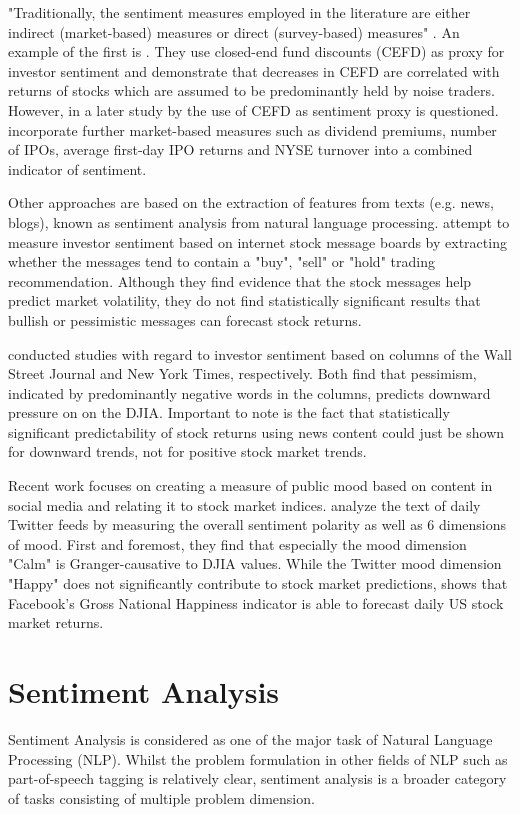 \documentclass[a4paper,12pt]{article}%
\begin{document}
"Traditionally, the sentiment measures employed in the literature are either indirect (market-based) measures or direct (survey-based) measures" \citep{Karabulut2013}. An example of the first is \citet{Lee1991}. They use closed-end fund discounts (CEFD) as proxy for investor sentiment and demonstrate that decreases in CEFD are correlated with returns of stocks which are assumed to be predominantly held by noise traders. However, in a later study by \citet{Qui2004}  the use of CEFD as sentiment proxy is questioned. \citet{Baker2006} incorporate further market-based measures such as dividend premiums, number of IPOs, average first-day IPO returns and NYSE turnover into a combined indicator of sentiment.

Other approaches are based on the extraction of features from texts (e.g. news, blogs), known as sentiment analysis from natural language processing. \citet{Antweiler2004} attempt to measure investor sentiment based on internet stock message boards by extracting whether the messages tend to contain a "buy", "sell" or "hold" trading recommendation. Although they find evidence that the stock messages help predict market volatility, they do not find statistically significant results that bullish or pessimistic messages can forecast stock returns.

\citet{Tetlock2007, Garcia2012} conducted studies with regard to investor sentiment based on columns of the Wall Street Journal and New York Times, respectively. Both find that pessimism, indicated by predominantly negative words in the columns, predicts downward pressure on on the DJIA. Important to note is the fact that statistically significant predictability of stock returns using news content could just be shown for downward trends, not for positive stock market trends.

Recent work focuses on creating a measure of public mood based on content in social media and relating it to stock market indices. \citet{Bollen2011} analyze the text of daily Twitter feeds by measuring the overall sentiment polarity as well as 6 dimensions of mood. First and foremost, they find that especially the mood dimension "Calm" is Granger-causative to DJIA values. While the Twitter mood dimension "Happy" does not significantly contribute to stock market predictions, \citet{Karabulut2013} shows that Facebook's Gross National Happiness indicator is able to forecast daily US stock market returns.


\section{Sentiment Analysis}
Sentiment Analysis is considered as one of the major task of Natural Language Processing (NLP). Whilst the problem formulation in other fields of NLP such as part-of-speech tagging is relatively clear, sentiment analysis is a broader category of tasks consisting of multiple problem dimension. 
\end{document}
